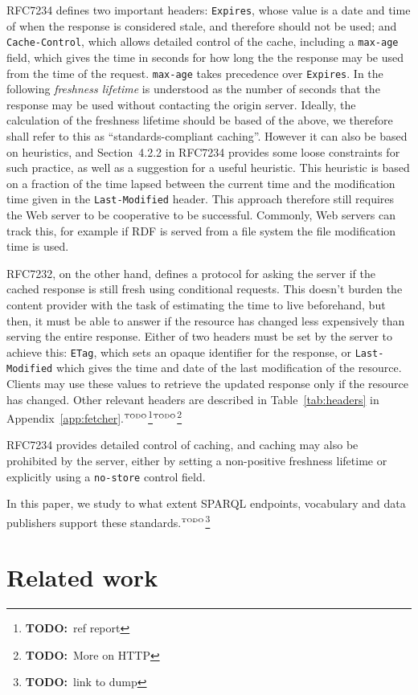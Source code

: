 \documentclass{llncs}
\newcommand{\httph}[1]{\texttt{#1}}
\newcommand{\todo}[1]{\ensuremath{^{\textrm{\tiny{TODO}\normalsize}}}\footnote{\textbf{TODO:}~#1}}
\begin{document}
RFC7234 defines two important headers: \httph{Expires}, whose value is
a date and time of when the response is considered stale, and
therefore should not be used; and \httph{Cache-Control}, which allows
detailed control of the cache, including a \httph{max-age} field,
which gives the time in seconds for how long the the response may be
used from the time of the request. \httph{max-age} takes precedence
over \httph{Expires}. In the following \emph{freshness lifetime} is
understood as the number of seconds that the response may be used
without contacting the origin server. Ideally, the calculation of the
freshness lifetime should be based of the above, we therefore shall
refer to this as ``standards-compliant caching''. However it can also
be based on heuristics, and Section~4.2.2 in RFC7234 provides some loose
constraints for such practice, as well as a suggestion for a useful
heuristic. This heuristic is based on a fraction of the time lapsed
between the current time and the modification time given in the
\httph{Last-Modified} header. This approach therefore still requires
the Web server to be cooperative to be successful. Commonly, Web
servers can track this, for example if RDF is served from a file
system the file modification time is used.

RFC7232, on the other hand, defines a protocol for asking the server
if the cached response is still fresh using conditional requests. This
doesn't burden the content provider with the task of estimating the
time to live beforehand, but then, it must be able to answer if the
resource has changed less expensively than serving the entire
response. Either of two headers must be set by the server to achieve
this: \httph{ETag}, which sets an opaque identifier for the response,
or \httph{Last-Modified} which gives the time and date of the last
modification of the resource. Clients may use these values to retrieve
the updated response only if the resource has changed. Other relevant
headers are described in Table~\ref{tab:headers}
in Appendix~\ref{app:fetcher}.\todo{ref report}\todo{More on HTTP}

RFC7234 provides detailed control of caching, and caching may also be
prohibited by the server, either by setting a non-positive freshness
lifetime or explicitly using a \httph{no-store} control field.

In this paper, we study to what extent SPARQL endpoints, vocabulary
and data publishers support these standards.\todo{link to dump}

\section{Related work}
\end{document}
